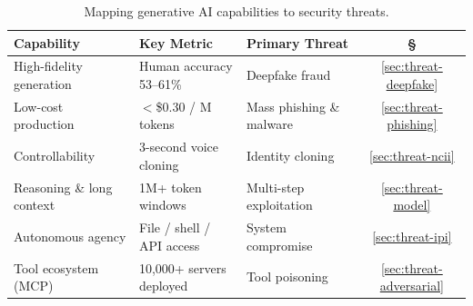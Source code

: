 
\begin{table}[htbp]
\centering
\caption{Mapping generative AI capabilities to security threats.}
\label{tab:cap-threat}

\fontsize{7}{9}\selectfont
\setlength{\tabcolsep}{5pt}
\renewcommand{\arraystretch}{1.3}

\begin{tabular}{l l l c}
\toprule
\textbf{Capability} & \textbf{Key Metric} & \textbf{Primary Threat} & \textbf{\S} \\
\midrule

\rowcolor{rowgray}
High-fidelity generation  & Human accuracy 53--61\%    & Deepfake fraud           & \ref{sec:threat-deepfake} \\
Low-cost production       & $<$\$0.30 / M tokens       & Mass phishing \& malware & \ref{sec:threat-phishing} \\
\rowcolor{rowgray}
Controllability           & 3-second voice cloning     & Identity cloning         & \ref{sec:threat-ncii} \\
Reasoning \& long context & 1M+ token windows          & Multi-step exploitation  & \ref{sec:threat-model} \\
\rowcolor{rowgray}
Autonomous agency         & File / shell / API access  & System compromise        & \ref{sec:threat-ipi} \\
Tool ecosystem (MCP)      & 10{,}000+ servers deployed & Tool poisoning           & \ref{sec:threat-adversarial} \\

\bottomrule
\end{tabular}
\end{table}
